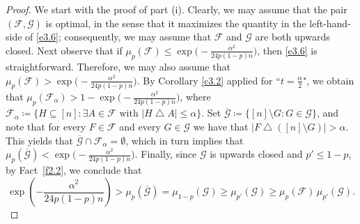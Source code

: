 \documentclass[10pt]{amsart}
\theoremstyle{remark}
\newcommand{\meg}{\geqslant}
\newcommand{\mik}{\leqslant}
\newcommand{\Fcal}{\mathcal{F}}
\newcommand{\Gcal}{\mathcal{G}}
\begin{document}
\begin{proof}
We start with the proof of part (i). Clearly, we may assume that the pair $(\Fcal,\Gcal)$ is
optimal, in the sense that it maximizes the quantity in the left-hand-side of \eqref{e3.6};
consequently, we may assume that $\Fcal$ and $\Gcal$ are both upwards closed.
Next observe that if $\mu_{p}(\Fcal)\mik \exp\big(-\frac{\alpha^2}{24p(1-p)n}\big)$,
then \eqref{e3.6} is straightforward. Therefore, we may also assume that
$\mu_{p}(\Fcal)>\exp\big(-\frac{\alpha^2}{24p(1-p)n}\big)$. By  Corollary \ref{c3.2} applied for ``$t=\frac{\alpha}{2}$",
we obtain that $\mu_{p}(\Fcal_{\alpha})>1-\exp\big(-\frac{\alpha^2}{24p(1-p)n}\big)$, where
$\Fcal_{\alpha}\coloneqq \{H\subseteq [n]: \exists A\in\Fcal \text{ with } |H\bigtriangleup A|\mik \alpha\}$.
Set $\overline{\Gcal}\coloneqq \{[n]\setminus G:G\in\Gcal\}$, and note that for every $F\in\Fcal$ and
every $G\in\Gcal$ we have that $|F\bigtriangleup([n]\setminus G)|>\alpha$. This yields that
$\overline{\Gcal}\cap\Fcal_{\alpha}=\emptyset$, which in turn implies that  $\mu_{p}(\overline{\Gcal})<\exp\big(-\frac{\alpha^2}{24p(1-p)n}\big)$. Finally,
since $\Gcal$ is upwards closed and $p'\mik 1-p$, by Fact~\ref{f2.2}, we conclude that
\begin{equation} \label{e3.8}
\exp\left(-\frac{\alpha^2}{24p(1-p)n}\right)> \mu_{p}(\overline{\Gcal})=
\mu_{1-p}(\Gcal) \meg \mu_{p'}(\Gcal) \meg \mu_{p}(\Fcal)\, \mu_{p'}(\Gcal).
\end{equation}


\end{proof}
\end{document}
